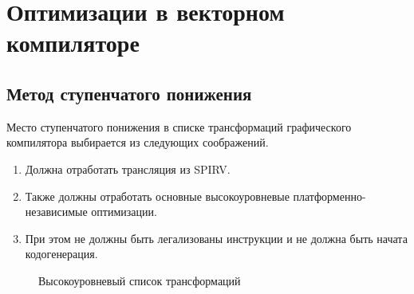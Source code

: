 \chapter{Оптимизации в векторном компиляторе}\label{ch:lowering}

\section{Метод ступенчатого понижения}\label{sec:lowering/passes}

Место ступенчатого понижения в списке трансформаций графического компилятора выбирается из следующих соображений.

\begin{enumerate}
\item Должна отработать трансляция из SPIRV.
\item Также должны отработать основные высокоуровневые платформенно-независимые оптимизации.
\item При этом не должны быть легализованы инструкции и не должна быть начата кодогенерация.
\end{enumerate}

\begin{figure}[ht]
    \caption{Высокоуровневый список трансформаций}\label{fig:highlevel-mgr}
\end{figure}

